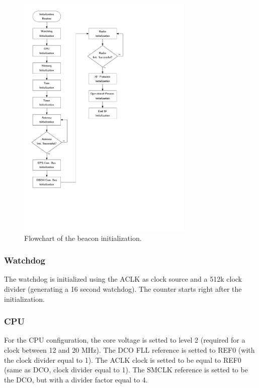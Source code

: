 \documentclass[12pt]{book}
\begin{document}
\begin{figure}[!h]
	\begin{center}
		\includegraphics[width=0.75\textwidth]{figures/beacon_init_flowchart.pdf}
		\caption{Flowchart of the beacon initialization.}
		\label{fig:beacon-init-flowchart}
	\end{center}
\end{figure}

\subsubsection{Watchdog}

The watchdog is initialized using the ACLK as clock source and a 512k clock divider (generating a 16 second watchdog). The counter starts right after the initialization.

\subsubsection{CPU}

For the CPU configuration, the core voltage is setted to level 2 (required for a clock between 12 and 20 MHz). The DCO FLL reference is setted to REF0 (with the clock divider equal to 1). The ACLK clock is setted to be equal to REF0 (same as DCO, clock divider equal to 1). The SMCLK reference is setted to be the DCO, but with a divider factor equal to 4.
\end{document}
